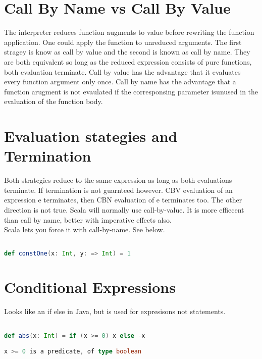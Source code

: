 \documentclass[10pt, a4paper]{report}
\begin{document}
\section{Call By Name vs Call By Value}
The interpreter reduces function augments to value before rewriting the function application. One could apply the function to unreduced arguments. The first stragey is know as call by value and the second is known as call by name. They are both equivalent so long as the reduced expression consists of pure functions, both evaluation terminate. Call by value has the advantage that it evaluates every function argument only once. Call by name has the advantage that a function arugment is not evaulated if the corresponsing parameter isunused in the evaluation of the function body.

\section{Evaluation stategies and Termination}

Both strategies reduce to the same expression as long as both evaluations terminate. If termination is not guarnteed however. CBV evaluation of an expression e terminates, then CBN evaluation of e terminates too. The other direction is not true. Scala will normally use call-by-value. It is more effiecent than call by name, better with imperative effects also.\\

Scala lets you force it with call-by-name. See below.

\begin{lstlisting}[language=scala]

def constOne(x: Int, y: => Int) = 1

\end{lstlisting}

\section{Conditional Expressions}

Looks like an if else in Java, but is used for expresisons not statements.

\begin{lstlisting}[language=scala]

def abs(x: Int) = if (x >= 0) x else -x

x >= 0 is a predicate, of type boolean

\end{lstlisting}
\end{document}
